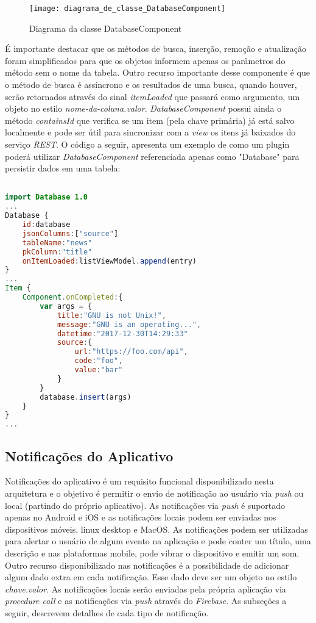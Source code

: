 \begin{figure}[H]
	\texttt{[image: diagrama\_de\_classe\_DatabaseComponent]}
	\centering
	\caption{Diagrama da classe DatabaseComponent}
\end{figure}

É importante destacar que os métodos de busca, inserção, remoção e atualização foram simplificados para que os objetos informem apenas os parâmetros do método sem o nome da tabela. Outro recurso importante desse componente é que o método de busca é assíncrono e os resultados de uma busca, quando houver, serão retornados através do sinal \textit{itemLoaded} que passará como argumento, um objeto no estilo \textit{nome-da-coluna.valor}. \textit{DatabaseComponent} possui ainda o método \textit{containsId} que verifica se um item (pela chave primária) já está salvo localmente e pode ser útil para sincronizar com a \textit{view} os itens já baixados do serviço \textit{REST}. O código a seguir, apresenta um exemplo de como um plugin poderá utilizar \textit{DatabaseComponent} referenciada apenas como "Database" para persistir dados em uma tabela:

\begin{center}
\begin{lstlisting}[language=qml]

import Database 1.0
...
Database {
	id:database
	jsonColumns:["source"]
	tableName:"news"
	pkColumn:"title"
	onItemLoaded:listViewModel.append(entry)
}
...
Item {
	Component.onCompleted:{
		var args = {
			title:"GNU is not Unix!",
			message:"GNU is an operating...",
			datetime:"2017-12-30T14:29:33"
			source:{
				url:"https://foo.com/api",
				code:"foo",
				value:"bar"
			}
		}
		database.insert(args)
	}
}
...
\end{lstlisting}
\end{center}


\subsection{Notificações do Aplicativo}
Notificações do aplicativo é um requisito funcional disponibilizado nesta arquitetura e o objetivo é permitir o envio de notificação ao usuário via \textit{push} ou local (partindo do próprio aplicativo). As notificações via \textit{push} é suportado apenas no Android e iOS e as notificações locais podem ser enviadas nos dispositivos móveis, linux desktop e MacOS. As notificações podem ser utilizadas para alertar o usuário de algum evento na aplicação e pode conter um título, uma descrição e nas plataformas mobile, pode vibrar o dispositivo e emitir um som. Outro recurso disponibilizado nas notificações é a possibilidade de adicionar algum dado extra em cada notificação. Esse dado deve ser um objeto no estilo \textit{chave.valor}. As notificações locais serão enviadas pela própria aplicação via \textit{procedure call} e as notificações via \textit{push} através do \textit{Firebase}. As subseções a seguir, descrevem detalhes de cada tipo de notificação.

